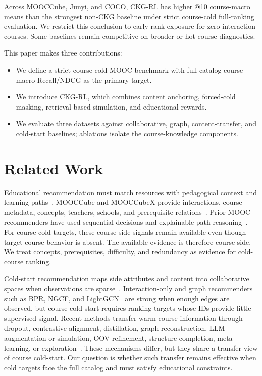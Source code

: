 \documentclass[letterpaper]{article}
\begin{document}
Across MOOCCube, Junyi, and COCO, CKG-RL has higher @10 course-macro means than the strongest non-CKG baseline under strict course-cold full-ranking evaluation. We restrict this conclusion to early-rank exposure for zero-interaction courses. Some baselines remain competitive on broader or hot-course diagnostics.

This paper makes three contributions:
\begin{itemize}
    \item We define a strict course-cold MOOC benchmark with full-catalog course-macro Recall/NDCG as the primary target.
    \item We introduce CKG-RL, which combines content anchoring, forced-cold masking, retrieval-based simulation, and educational rewards.
    \item We evaluate three datasets against collaborative, graph, content-transfer, and cold-start baselines; ablations isolate the course-knowledge components.
\end{itemize}

\section{Related Work}
Educational recommendation must match resources with pedagogical context and learning paths~\cite{dasilva2023educationalrs,rahayu2023learningpath}. MOOCCube and MOOCCubeX provide interactions, course metadata, concepts, teachers, schools, and prerequisite relations~\cite{yu2020mooccube,wang2021mooccubex}. Prior MOOC recommenders have used sequential decisions and explainable path reasoning~\cite{zhang2019hrlcourse,dessi2024findingpaths}. For course-cold targets, these course-side signals remain available even though target-course behavior is absent. The available evidence is therefore course-side. We treat concepts, prerequisites, difficulty, and redundancy as evidence for cold-course ranking.

Cold-start recommendation maps side attributes and content into collaborative spaces when observations are sparse~\cite{schein2002coldstart,gantner2010attribute,liu2024once,wu2024llmrec,zhang2025coldstartllm}. Interaction-only and graph recommenders such as BPR, NGCF, and LightGCN~\cite{rendle2009bpr,wang2019ngcf,he2020lightgcn} are strong when enough edges are observed, but course cold-start requires ranking targets whose IDs provide little supervised signal. Recent methods transfer warm-course information through dropout, contrastive alignment, distillation, graph reconstruction, LLM augmentation or simulation, OOV refinement, structure completion, meta-learning, or exploration~\cite{volkovs2017dropoutnet,zhou2023ccfcrec,huang2023aldi,kim2024cgrc,wang2024llmaugmenter,huang2025coldllm,zhao2024usim,zhao2025fsgnn,luo2025pam,jiang2025itemcentric}. These mechanisms differ, but they share a transfer view of course cold-start. Our question is whether such transfer remains effective when cold targets face the full catalog and must satisfy educational constraints.
\end{document}
